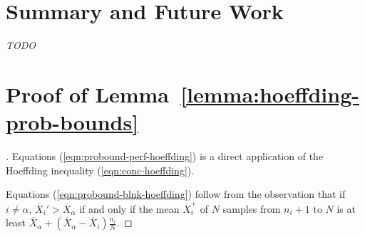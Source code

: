 \documentclass{article}
\begin{document}
\section{Summary and Future Work}

\textit{TODO}

\clearpage

\appendix

\section{Proof of Lemma~\ref{lemma:hoeffding-prob-bounds}}
\label{app:hoeffding-prob-bounds-proof}

\begin{proof}[]
Equations (\ref{eqn:probound-perf-hoeffding}) is a direct
application of the Hoeffding inequality (\ref{eqn:conc-hoeffding}).

Equations (\ref{eqn:probound-blnk-hoeffding}) follow from the
observation that if $i\ne\alpha$, $\overline X_i'>\overline X_\alpha$
if and only if the mean $\overline X_i^+$ of $N$ samples from $n_i+1$
to $N$ is at least $\overline X_\alpha+(\overline X_\alpha-\overline
X_i)\frac {n_i} N$.


\end{proof}
\end{document}
